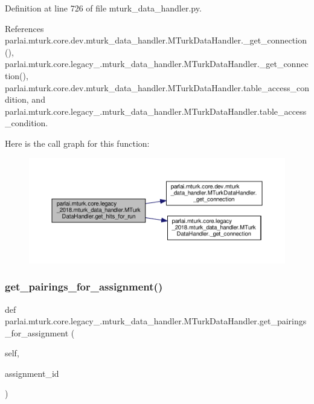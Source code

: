 Definition at line 726 of file mturk\+\_\+data\+\_\+handler.\+py.



References parlai.\+mturk.\+core.\+dev.\+mturk\+\_\+data\+\_\+handler.\+M\+Turk\+Data\+Handler.\+\_\+get\+\_\+connection(), parlai.\+mturk.\+core.\+legacy\+\_.\+mturk\+\_\+data\+\_\+handler.\+M\+Turk\+Data\+Handler.\+\_\+get\+\_\+connection(), parlai.\+mturk.\+core.\+dev.\+mturk\+\_\+data\+\_\+handler.\+M\+Turk\+Data\+Handler.\+table\+\_\+access\+\_\+condition, and parlai.\+mturk.\+core.\+legacy\+\_.\+mturk\+\_\+data\+\_\+handler.\+M\+Turk\+Data\+Handler.\+table\+\_\+access\+\_\+condition.

Here is the call graph for this function\+:
\nopagebreak
\begin{figure}[H]
\begin{center}
\leavevmode
\includegraphics[width=350pt]{classparlai_1_1mturk_1_1core_1_1legacy__2018_1_1mturk__data__handler_1_1MTurkDataHandler_afaf45ff6c49973482b7059a4f047b3ec_cgraph}
\end{center}
\end{figure}
\mbox{\label{classparlai_1_1mturk_1_1core_1_1legacy__2018_1_1mturk__data__handler_1_1MTurkDataHandler_a1ca83cec6867537d2a72e47beee0ca84}} 
\subsubsection{\texorpdfstring{get\+\_\+pairings\+\_\+for\+\_\+assignment()}{get\_pairings\_for\_assignment()}}
{\footnotesize\ttfamily def parlai.\+mturk.\+core.\+legacy\+\_.\+mturk\+\_\+data\+\_\+handler.\+M\+Turk\+Data\+Handler.\+get\+\_\+pairings\+\_\+for\+\_\+assignment (\begin{DoxyParamCaption}\item[{}]{self,  }\item[{}]{assignment\+\_\+id }\end{DoxyParamCaption})}

